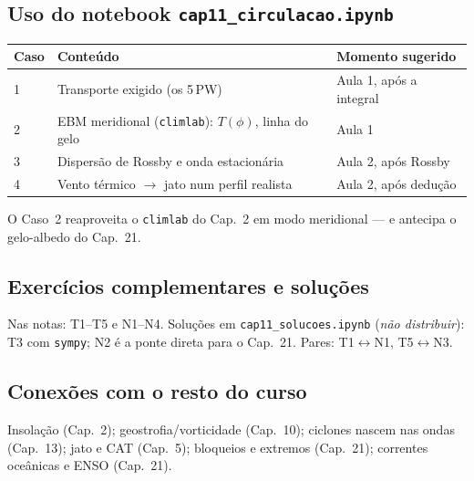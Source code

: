 \subsection*{Uso do notebook \texttt{cap11\_circulacao.ipynb}}

\begin{center}
\begin{tabular}{lll}
\hline
Caso & Conteúdo & Momento sugerido \\
\hline
1 & Transporte exigido (os 5\,PW) & Aula 1, após a integral \\
2 & EBM meridional (\texttt{climlab}): $T(\phi)$, linha do gelo & Aula 1 \\
3 & Dispersão de Rossby e onda estacionária & Aula 2, após Rossby \\
4 & Vento térmico $\to$ jato num perfil realista & Aula 2, após dedução \\
\hline
\end{tabular}
\end{center}

O Caso~2 reaproveita o \texttt{climlab} do Cap.~2 em modo meridional — e
antecipa o gelo-albedo do Cap.~21.

\subsection*{Exercícios complementares e soluções}

Nas notas: T1--T5 e N1--N4. Soluções em \texttt{cap11\_solucoes.ipynb}
(\emph{não distribuir}): T3 com \texttt{sympy}; N2 é a ponte direta para o
Cap.~21. Pares: T1$\leftrightarrow$N1, T5$\leftrightarrow$N3.

\subsection*{Conexões com o resto do curso}

Insolação (Cap.~2); geostrofia/vorticidade (Cap.~10); ciclones nascem nas
ondas (Cap.~13); jato e CAT (Cap.~5); bloqueios e extremos (Cap.~21);
correntes oceânicas e ENSO (Cap.~21).
